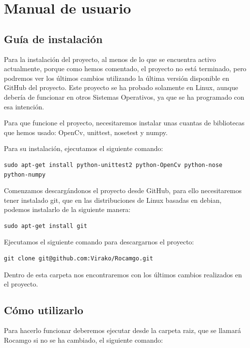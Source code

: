 \documentclass[12pt,a4papert,woside,openright,titlepage,final]{book}
\begin{document}
\chapter{Manual de usuario}

\section{Guía de instalación} 

Para la instalación del proyecto, al menos de lo que se encuentra activo
actualmente, porque como hemos comentado, el proyecto no está terminado, pero
podremos ver los últimos cambios utilizando la última versión disponible en
GitHub del proyecto. Este proyecto se ha probado solamente en Linux, aunque
debería de funcionar en otros Sistemas Operativos, ya que se ha programado
con esa intención.

Para que funcione el proyecto, necesitaremos instalar unas cuantas de bibliotecas
que hemos usado: OpenCv, unittest, nosetest y numpy.

Para su instalación, ejecutamos el siguiente comando:

\begin{verbatim}
sudo apt-get install python-unittest2 python-OpenCv python-nose python-numpy
\end{verbatim}

Comenzamos descargándonos el proyecto desde GitHub, para ello necesitaremos
tener instalado git, que en las distribuciones de Linux basadas en debian,
podemos instalarlo de la siguiente manera: 

\begin{verbatim}
sudo apt-get install git
\end{verbatim}

Ejecutamos el siguiente comando para descargarnos el proyecto: 

\begin{verbatim}
git clone git@github.com:Virako/Rocamgo.git
\end{verbatim}

Dentro de esta carpeta nos encontraremos con los últimos cambios realizados en
el proyecto.


\section{Cómo utilizarlo}

Para hacerlo funcionar deberemos ejecutar desde la carpeta raiz,
que se llamará Rocamgo si no se ha cambiado, el siguiente comando:
\end{document}
